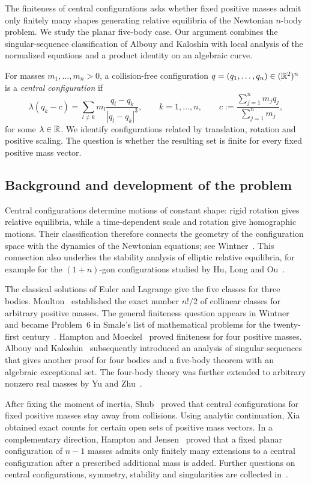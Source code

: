 \documentclass[Threeside,11pt]{article}
\theoremstyle{definition}
\theoremstyle{remark}
\numberwithin{equation}{section}
\theoremstyle{remark}
\begin{document}
The finiteness of central configurations asks whether fixed positive masses admit
only finitely many shapes generating relative equilibria of the Newtonian
$n$-body problem. We study the planar five-body case. Our argument combines the
singular-sequence classification of Albouy and Kaloshin with local analysis of
the normalized equations and a product identity on an algebraic curve.

For masses $m_1,\dots,m_n>0$, a collision-free configuration
$q=(q_1,\dots,q_n)\in(\mathbb R^2)^n$ is a \emph{central configuration} if
\[
 \lambda(q_k-c)=\sum_{l\ne k}m_l\frac{q_l-q_k}{|q_l-q_k|^3},
 \qquad k=1,\dots,n,\qquad
 c:=\frac{\sum_{j=1}^n m_jq_j}{\sum_{j=1}^n m_j},
\]
for some $\lambda\in\mathbb R$. We identify configurations related by translation,
rotation and positive scaling. The question is whether the resulting set is
finite for every fixed positive mass vector.

\subsection*{Background and development of the problem}
Central configurations determine motions of constant shape: rigid rotation
gives relative equilibria, while a time-dependent scale and rotation give
homographic motions. Their classification therefore connects the geometry of
the configuration space with the dynamics of the Newtonian equations; see
Wintner~\cite{Wintner}. This connection also underlies the stability analysis of
elliptic relative equilibria, for example for the $(1+n)$-gon configurations
studied by Hu, Long and Ou~\cite{HLO20}.

The classical solutions of Euler and Lagrange give the five classes for three
bodies. Moulton~\cite{Moulton} established the exact number $n!/2$ of collinear
classes for arbitrary positive masses. The general finiteness question appears
in Wintner~\cite{Wintner} and became Problem~6 in Smale's list of mathematical
problems for the twenty-first century~\cite{Smale}. Hampton and
Moeckel~\cite{HM} proved finiteness for four positive masses. Albouy and
Kaloshin~\cite{AK} subsequently introduced an analysis of singular sequences
that gives another proof for four bodies and a five-body theorem with an
algebraic exceptional set. The four-body theory was further extended to
arbitrary nonzero real masses by Yu and Zhu~\cite{YZ}.

After fixing the moment of inertia, Shub~\cite{Shub71} proved that central
configurations for fixed positive masses stay away from collisions.
Using analytic continuation, Xia~\cite{Xia91} obtained exact counts for
certain open sets of positive mass vectors. In a complementary direction,
Hampton and Jensen~\cite{HJ15} proved that a fixed planar configuration of
$n-1$ masses admits only finitely many extensions to a central configuration
after a prescribed additional mass is added. Further questions on central
configurations, symmetry, stability and singularities are collected
in~\cite{ACS12}.
\end{document}
